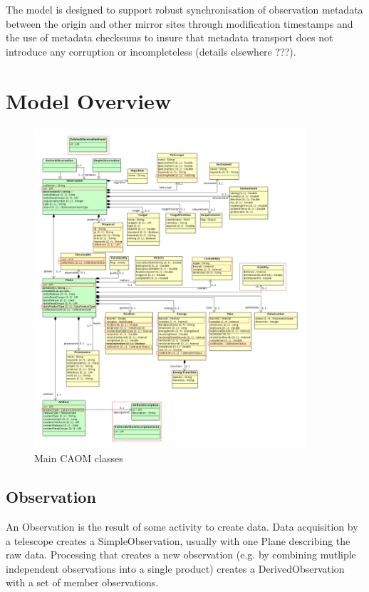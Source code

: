 \documentclass[11pt,a4paper]{ivoa}
\begin{document}
The model is designed to support robust synchronisation of observation metadata 
between the origin and other mirror sites through modification timestamps and 
the use of metadata checksums to insure that metadata transport does not introduce
any corruption or incompleteless (details elsewhere ???).

\section{Model Overview}

\begin{figure}
\centering
\includegraphics[width=0.9\textwidth]{src/uml/CAOM1core.png}
\caption{Main CAOM classes}
\label{fig:core}
\end{figure}

\subsection{Observation}

An Observation is the result of some activity to create data. Data acquisition by a 
telescope creates a SimpleObservation, usually with one Plane describing the raw 
data. Processing that creates a new observation (e.g. by combining mutliple independent
observations into a single product) creates a DerivedObservation with a set of member
observations. 
\end{document}
